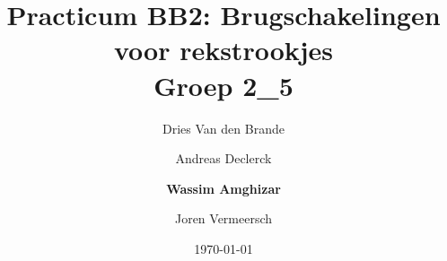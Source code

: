 \documentclass[12pt]{article}
\begin{document}
    \title{\textbf{Practicum BB2: Brugschakelingen voor rekstrookjes} \\\small{Groep 2\_5}}
    \author{Dries Van den Brande \and Andreas Declerck \and \textbf{Wassim Amghizar} \and Joren Vermeersch}
    \date{\today}

    \maketitle


    

    

    

    

    

    

    

    

    
\end{document}
